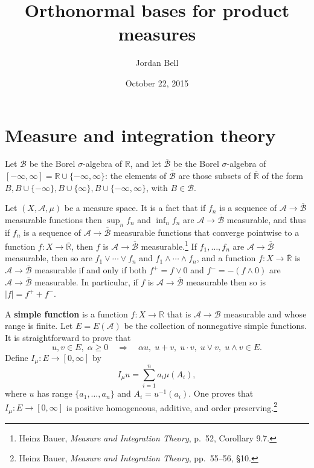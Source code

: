 \documentclass{article}
\theoremstyle{definition}
\begin{document}
\title{Orthonormal bases for product measures}
\author{Jordan Bell}
\date{October 22, 2015}

\maketitle

\section{Measure and integration theory}
Let $\mathscr{B}$ be the Borel $\sigma$-algebra of $\mathbb{R}$, and let
$\overline{\mathscr{B}}$ be the Borel $\sigma$-algebra of $[-\infty,\infty]=\mathbb{R} \cup \{-\infty,\infty\}$:
the elements of $\overline{\mathscr{B}}$ are those subsets of $\overline{\mathbb{R}}$ of
the form
$B,B \cup \{-\infty\},B \cup \{\infty\}, B \cup \{-\infty,\infty\}$, with $B \in \mathscr{B}$. 

Let $(X,\mathscr{A},\mu)$ be a measure space.
It is a fact that if $f_n$ is a sequence of $\mathscr{A} \to \overline{\mathscr{B}}$ measurable functions then
$\sup_n f_n$ and $\inf_n f_n$ are $\mathscr{A} \to \overline{\mathscr{B}}$ measurable, and thus  if
$f_n$ is a sequence of $\mathscr{A} \to \overline{\mathscr{B}}$ measurable functions
that converge pointwise to a function $f:X \to \overline{\mathbb{R}}$, then
$f$ is $\mathscr{A}\to \overline{\mathscr{B}}$ measurable.\footnote{Heinz Bauer,
{\em Measure and Integration Theory}, p.~52, Corollary 9.7.} If $f_1,\ldots,f_n$ are $\mathscr{A} \to \overline{\mathscr{B}}$ measurable,
then so are $f_1 \vee \cdots \vee  f_n$ and $f_1 \wedge \cdots \wedge f_n$, and
a function $f:X \to \overline{\mathbb{R}}$ is $\mathscr{A} \to \overline{\mathscr{B}}$ measurable
if and only if both
$f^+=f \vee 0$ and $f^-=-(f \wedge 0)$ are $\mathscr{A} \to \overline{\mathscr{B}}$ measurable. In particular,
if $f$ is $\mathscr{A} \to \overline{\mathscr{B}}$ measurable then so is $|f|=f^++f^-$. 

A \textbf{simple function} is a function $f:X \to \mathbb{R}$ that is 
$\mathscr{A} \to \mathscr{B}$ measurable and whose range is finite. 
Let $E=E(\mathscr{A})$ be the collection of nonnegative simple functions. It is straightforward to prove that
\[
u,v \in E,\; \alpha \geq 0\quad \Rightarrow \quad \alpha u, \; u+v, \; u\cdot v, \; u\vee v, \; u\wedge v \in E.
\]
Define $I_\mu:E \to [0,\infty]$ by
\[
I_\mu u =  \sum_{i=1}^n a_i \mu(A_i),
\]
where $u$ has
 range $\{a_1,\ldots,a_n\}$ and 
$A_i = u^{-1}(a_i)$.
One proves that $I_\mu:E \to [0,\infty]$ is positive homogeneous, additive, and order preserving.\footnote{Heinz Bauer,
{\em Measure and Integration Theory}, pp.~55--56, \S 10.} 
\end{document}
